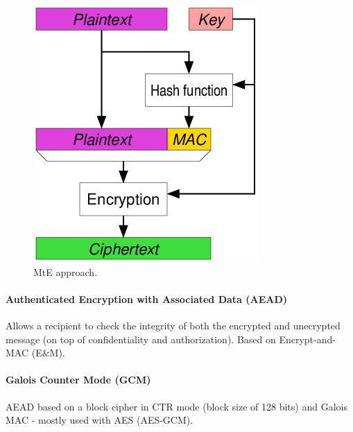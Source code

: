 \begin{figure}[h]
	\centering
	\includegraphics[scale=0.4]{images/1-MtE.png}
	\caption{MtE approach.}
	\label{fig:mte}
\end{figure}

\paragraph{Authenticated Encryption with Associated Data (AEAD)}
Allows a recipient to check the integrity of both the encrypted and unecrypted message (on top of confidentiality and authorization). Based on Encrypt-and-MAC (E\&M).

\paragraph{Galois Counter Mode (GCM)}
AEAD based on a block cipher in CTR mode (block size of 128 bits) and Galois MAC - mostly used with AES (AES-GCM). 

